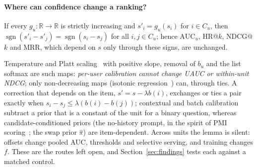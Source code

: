 \paragraph{Where can confidence change a ranking?}
\begin{lemma}[Invariance]\label{lem:invariance}
If every $g_u:\mathbb R\to\mathbb R$ is strictly increasing and $s'_i=g_u(s_i)$ for $i\in C_u$, then
$\operatorname{sgn}(s'_i-s'_j)=\operatorname{sgn}(s_i-s_j)$ for all $i,j\in C_u$; hence $\mathrm{AUC}_u$, HR@$k$, NDCG@$k$ and MRR,
which depend on $s$ only through these signs, are unchanged.
\end{lemma}
Temperature and Platt scaling~\citep{guo2017calibration,platt2000probabilities} with positive slope, removal of $b_u$ and the list
softmax are such maps: \emph{per-user calibration cannot change UAUC or within-unit NDCG}; only non-decreasing maps (isotonic
regression~\citep{zadrozny2002transforming}) can, through ties. A correction that depends on the item, $s'=s-\lambda b(i)$, exchanges
or ties a pair exactly when $s_i-s_j\le\lambda(b(i)-b(j))$; contextual and batch calibration~\citep{zhao2021calibrate,zhou2024batch}
subtract a prior that is a constant of the unit for a binary question, whereas candidate-conditioned priors (the no-history prompt,
in the spirit of PMI scoring~\citep{holtzman2021surface}; the swap prior $\hat\pi$) are item-dependent. Across units the lemma is
silent: offsets change pooled AUC, thresholds and selective serving, and training changes $f$. These are the routes left open, and
Section~\ref{sec:findings} tests each against a matched control.
